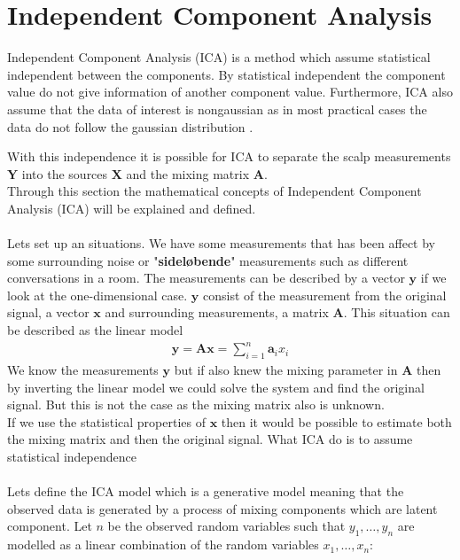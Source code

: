 \section{Independent Component Analysis}\label{sec:ICA}
Independent Component Analysis (ICA) is a method which assume statistical independent between the components. By statistical independent the component value do not give information of another component value. Furthermore, ICA also assume that the data of interest is nongaussian as in most practical cases the data do not follow the gaussian distribution \cite[p. 3]{ICA}.


With this independence it is possible for ICA to separate the scalp measurements $\mathbf{Y}$ into the sources $\mathbf{X}$ and the mixing matrix $\mathbf{A}$.
\\
Through this section the mathematical concepts of Independent Component Analysis (ICA) will be explained and defined.
\\ \\
Lets set up an situations. We have some measurements that has been affect by some surrounding noise or "\textbf{sideløbende}" measurements such as different conversations in a room. The measurements can be described by a vector $\mathbf{y}$ if we look at the one-dimensional case. $\mathbf{y}$ consist of the measurement from the original signal, a vector $\mathbf{x}$ and surrounding measurements, a matrix $\mathbf{A}$. This situation can be described as the linear model
\begin{align*}
\mathbf{y} = \mathbf{Ax} = \sum_{i=1}^n \mathbf{a}_i x_i
\end{align*}
We know the measurements $\mathbf{y}$ but if also knew the mixing parameter in $\mathbf{A}$ then by inverting the linear model we could solve the system and find the original signal. But this is not the case as the mixing matrix also is unknown.
\\
If we use the statistical properties of $\mathbf{x}$ then it would be possible to estimate both the mixing matrix and then the original signal. What ICA do is to assume statistical independence 
\\ \\
Lets define the ICA model which is a generative model meaning that the observed data is generated by a process of mixing components which are latent component. Let $n$ be the observed random variables such that $y_1, \dots, y_n$ are modelled as a linear combination of the random variables $x_1, \dots, x_n$:
